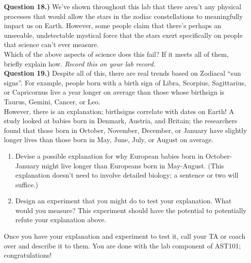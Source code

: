 \documentclass[11pt]{article}
\begin{document}
\textbf{Question 18.)} We've shown throughout this lab that there aren't any physical processes that would allow the stars in the zodiac constellations to meaningfully impact us on Earth. However, some people claim that there's perhaps an unseeable, undetectable mystical force that the stars exert specifically on people that science can't ever measure.\\

Which of the above aspects of science does this fail? If it meets all of them, briefly explain how. {\it Record this on your lab record.}	\\
%

\textbf{Question 19.)} Despite all of this, there {\it} are real trends based on Zodiacal ``sun signs''. For example, people born with a birth sign of Libra, Scorpius, Sagittarius, or Capricornus live a year longer on average than those whose birthsign is Taurus, Gemini, Cancer, or Leo.\\

However, there is an explanation; birthsigns correlate with dates on Earth! A study looked at babies born in Denmark, Austria, and Britain; the researchers found that those born in October, November, December, or January have slightly longer lives than those born in May, June, July, or August on average.



\bigskip


\begin{enumerate}
	\item Devise a possible explanation for why European babies born in October-January might live longer than Europeans born in May-August. (This explanation doesn't need to involve detailed biology; a sentence or two will suffice.)
	\item Design an experiment that you might do to test your explanation. What would you measure? This experiment should have the potential to potentially refute your explanation above.
\end{enumerate}

Once you have your explanation and experiment to test it, call your TA or coach over and describe it to them. You are done with the lab component of AST101; congratulations!

\vspace{1.5cm}
\hrulefill
\end{document}
